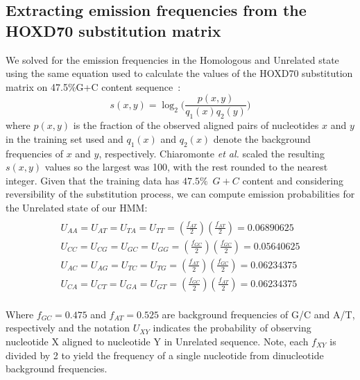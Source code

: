 
\subsection{Extracting emission frequencies from the HOXD70 substitution matrix}
We solved for the emission frequencies in the
Homologous and Unrelated state using the same equation used to
calculate the values of the HOXD70 substitution matrix on 47.5\%G+C
content sequence~\cite{hoxd}:
\begin{equation}
s(x,y)= \log_{2}{\Bigg(\frac{p(x,y)}{q_{1}(x)q_{2}(y)}\Bigg)}
\end{equation}
{w}here $p(x,y)$ is the fraction of the observed aligned pairs of
nucleotides $x$ and $y$ in the training set used and $q_{1}(x)$ and
$q_{2}(x)$ denote the background frequencies of $x$ and $y$,
respectively. Chiaromonte \textit{et al.} scaled the resulting
$s(x,y)$ values so the largest was 100,
with the rest rounded to the nearest integer.  Given that the training
data has $47.5\%$~$G+C$ content and considering reversibility of the substitution process, we can compute emission probabilities for the Unrelated state
of our HMM:
\begin{multline}\\
U_{AA}=U_{AT}=U_{TA}=U_{TT}=(\frac{f_{AT}}{2})(\frac{f_{AT}}{2})
= 0.06890625 \\
U_{CC}=U_{CG}=U_{GC}=U_{GG}=(\frac{f_{GC}}{2})(\frac{f_{GC}}{2}) =
0.05640625 \\
U_{AC}=U_{AG}=U_{TC}=U_{TG}=(\frac{f_{AT}}{2})(\frac{f_{GC}}{2}) =
0.06234375 \\
U_{CA}=U_{CT}=U_{GA}=U_{GT}=(\frac{f_{GC}}{2})(\frac{f_{AT}}{2}) =
0.06234375 \\
\end{multline}

Where $f_{GC}=0.475$ and $f_{AT}=0.525$ are background frequencies of
G/C and A/T, respectively and the notation $U_{XY}$ indicates the probability of observing nucleotide X aligned to
nucleotide Y in Unrelated sequence.    Note, each $f_{XY}$ is divided by 2 to yield the frequency of a single nucleotide from dinucleotide background frequencies.


